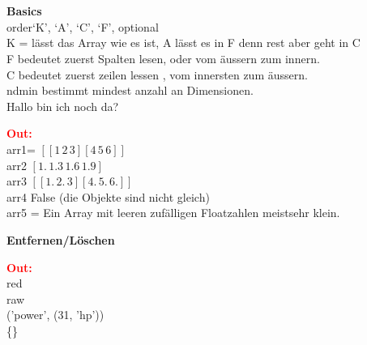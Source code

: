 \\
\vspace{0.5cm}
\\\vspace{0.1cm}
\textbf{Basics}
\\
order{‘K’, ‘A’, ‘C’, ‘F’}, optional\\
K = lässt das Array wie es ist, A lässt es in F denn rest aber geht in C\\
F bedeutet zuerst Spalten lesen, oder vom äussern zum innern.\\
C bedeutet zuerst zeilen lessen , vom innersten zum äussern.\\
ndmin bestimmt mindest anzahl an Dimensionen.\\
Hallo bin ich noch da?
\\
\begin{minipage}[h]{10cm}
	
\end{minipage}
\begin{minipage}[h]{8cm}
	\textcolor{red}{\textbf{Out:}} \\
	arr1= $[[1\, 2\, 3][4\, 5\, 6]]$
	\\ arr2 $[1.\,  1.3\, 1.6\, 1.9]$
	\\ arr3 $[[1.\, 2.\, 3][4.\, 5.\, 6.]]$
	\\ arr4 False (die Objekte sind nicht gleich)
	\\ arr5 = Ein Array mit leeren zufälligen Floatzahlen meistsehr klein.
	\\
\end{minipage}
\newpage
\hspace{-0.5cm}
\textbf{Entfernen/Löschen}
\\
\begin{minipage}[h]{10cm}
	
\end{minipage}
\begin{minipage}[h]{8cm}
	\textcolor{red}{\textbf{Out:}}
	\\red
	\\raw
	\\('power', (31, 'hp'))
	\\\{\}
\end{minipage}

